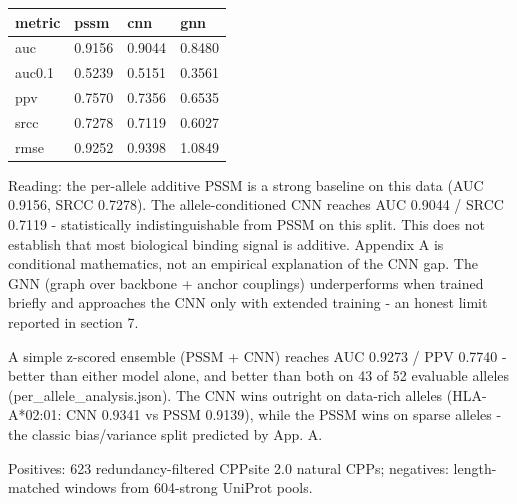 
\begin{longtable}[]{@{}llll@{}}
\toprule
metric & pssm & cnn & gnn\tabularnewline
\midrule
\endhead
auc & 0.9156 & 0.9044 & 0.8480\tabularnewline
auc0.1 & 0.5239 & 0.5151 & 0.3561\tabularnewline
ppv & 0.7570 & 0.7356 & 0.6535\tabularnewline
srcc & 0.7278 & 0.7119 & 0.6027\tabularnewline
rmse & 0.9252 & 0.9398 & 1.0849\tabularnewline
\bottomrule
\end{longtable}

Reading: the per-allele additive PSSM is a strong baseline on this data (AUC 0.9156, SRCC 0.7278). The allele-conditioned CNN reaches AUC 0.9044 / SRCC 0.7119 - statistically indistinguishable from PSSM on this split. This does not establish that most biological binding signal is additive. Appendix A is conditional mathematics, not an empirical explanation of the CNN gap. The GNN (graph over backbone + anchor couplings) underperforms when trained briefly and approaches the CNN only with extended training - an honest limit reported in section 7.


A simple z-scored ensemble (PSSM + CNN) reaches AUC 0.9273 / PPV 0.7740 - better than either model alone, and better than both on 43 of 52 evaluable alleles (per\_allele\_analysis.json). The CNN wins outright on data-rich alleles (HLA-A*02:01: CNN 0.9341 vs PSSM 0.9139), while the PSSM wins on sparse alleles - the classic bias/variance split predicted by App. A.


Positives: 623 redundancy-filtered CPPsite 2.0 natural CPPs; negatives: length-matched windows from 604-strong UniProt pools.


